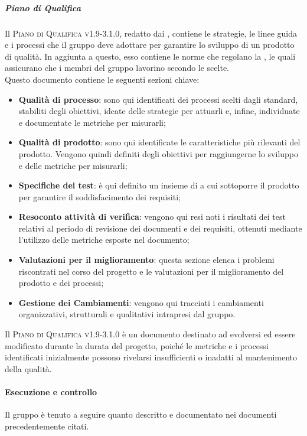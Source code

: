 \documentclass[../norme-di-progetto.tex]{subfiles}
\begin{document}
\subparagraph*{Piano di Qualifica}
Il \textsc{Piano di Qualifica v1.9-3.1.0}, redatto dai , contiene le strategie, le linee guida e i processi che il gruppo deve adottare per garantire lo sviluppo di un prodotto di qualità. In aggiunta a questo, esso contiene le norme che regolano la , le quali assicurano che i membri del gruppo lavorino secondo le  scelte. \\
Questo documento contiene le seguenti sezioni chiave:
\begin{itemize}
  \item \textbf{Qualità di processo}: sono qui identificati dei processi scelti dagli standard, stabiliti degli obiettivi, ideate delle strategie per attuarli e, infine, individuate e documentate le metriche per misurarli;
  \item \textbf{Qualità di prodotto}: sono qui identificate le caratteristiche più rilevanti del prodotto. Vengono quindi definiti degli obiettivi per raggiungerne lo sviluppo e delle metriche per misurarli;
  \item \textbf{Specifiche dei test}: è qui definito un insieme di  a cui sottoporre il prodotto per garantire il soddisfacimento dei requisiti;
  \item \textbf{Resoconto attività di verifica}: vengono qui resi noti i risultati dei test relativi al periodo di revisione dei documenti e dei requisiti, ottenuti mediante l'utilizzo delle metriche esposte nel documento;
  \item \textbf{Valutazioni per il miglioramento}: questa sezione elenca i problemi riscontrati nel corso del progetto e le valutazioni per il miglioramento del prodotto e dei processi;
  \item \textbf{Gestione dei Cambiamenti}: vengono qui tracciati i cambiamenti organizzativi, strutturali e qualitativi intrapresi dal gruppo.
\end{itemize}
Il \textsc{Piano di Qualifica v1.9-3.1.0} è un documento destinato ad evolversi ed essere modificato durante la durata del progetto, poiché le metriche e i processi identificati inizialmente possono rivelarsi insufficienti o inadatti al mantenimento della qualità.

\paragraph{Esecuzione e controllo}
Il gruppo è tenuto a seguire quanto descritto e documentato nei documenti precedentemente citati.
\end{document}
